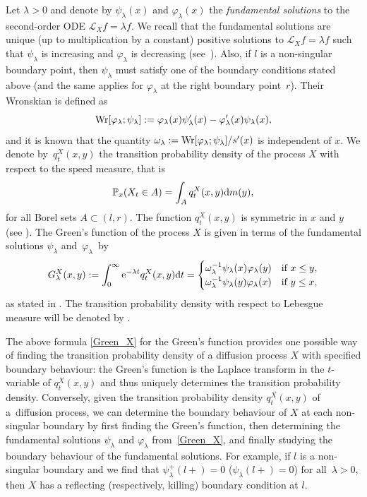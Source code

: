 \documentclass[10pt,a4paper]{amsart}
\numberwithin{equation}{section}
\theoremstyle{definition}
\def\L{{\mathcal L}}
\def\p{{\mathbb P}}
\def\wr{{\textnormal{Wr}}}
\def\d{{\textnormal d}}
\begin{document}
Let $\lambda>0$ and denote by $\psi_{\lambda}(x)$ and $\varphi_{\lambda}(x)$ the {\it fundamental solutions} to the second-order ODE $\L_X f=\lambda f$. We recall that the fundamental solutions are unique (up to multiplication by a constant) positive solutions to $\L_X f=\lambda f$ such that $\psi_{\lambda}$ is increasing and $\varphi_{\lambda}$ is decreasing
(see~\cite[Section II.10]{Borodin2002}). Also, if $l$ is a non-singular boundary point, then $\psi_{\lambda}$ must satisfy one of the boundary conditions stated above (and the same applies for $\varphi_{\lambda}$ at the right boundary point~$r$). Their Wronskian is defined as
 \begin{equation*}
\wr[\varphi_{\lambda}; \psi_{\lambda}]:=\varphi_{\lambda}(x) \psi'_{\lambda}(x)- \varphi'_{\lambda}(x)\psi_{\lambda}(x),
 \end{equation*}
 and it is known that the quantity $\omega_{\lambda}:=\wr[\varphi_{\lambda}; \psi_{\lambda}]/s'(x)$ is independent of $x$. We denote by~$q^X_t(x,y)$ the transition probability density of the process $X$ with respect to the speed measure, that is
 \[
 \p_x(X_t \in A)=\int_A q^X_t(x,y) \d m(y),
 \]
 for all Borel sets $ A \subset (l,r)$.
 The function $q^X_t(x,y)$ is symmetric in $x$ and $y$ (see \cite[Section~II.4]{Borodin2002}). The Green's function of the process $X$ is given in terms of the fundamental solutions $\psi_{\lambda}$ and~$\varphi_{\lambda}$~by
\begin{gather}\label{Green_X}
 G^X_{\lambda}(x,y):=
 \int_0^{\infty} {\rm e}^{-\lambda t} q^X_t(x,y) \d t=
 \begin{cases}
 \omega_{\lambda}^{-1} \psi_{\lambda}(x) \varphi_{\lambda}(y) & \text{if } x\le y, \\
 \omega_{\lambda}^{-1} \psi_{\lambda}(y) \varphi_{\lambda}(x)  & \text{if } y\le x,
 \end{cases}
\end{gather}
as stated in \cite[Section II.11]{Borodin2002}. The transition probability density with respect to Lebesgue measure will be denoted by
.

The above formula \eqref{Green_X} for the Green's function provides one possible way of finding the transition probability density of a diffusion process $X$ with specified boundary behaviour: the Green's function is the Laplace transform in the $t$-variable of $q_{t}^X(x,y)$ and thus uniquely determines the transition probability density. Conversely, given the transition probability density $q_t^{X}(x,y)$ of a~diffusion process, we can determine the boundary behaviour of $X$ at each non-singular boundary by first finding the Green's function, then determining the fundamental solutions $\psi_{\lambda}$ and $\varphi_{\lambda}$ from~\eqref{Green_X}, and finally studying the boundary behaviour of the fundamental solutions. For example, if $l$ is a non-singular boundary and we find that $\psi_{\lambda}^+(l+)=0$ ($\psi_{\lambda}(l+)=0$) for all~${\lambda>0}$, then $X$ has a reflecting (respectively, killing) boundary condition at $l$.
\end{document}
